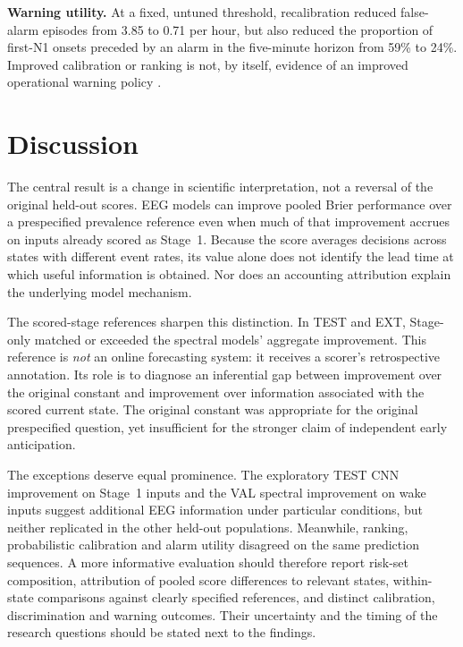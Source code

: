 \documentclass{article}
\begin{document}
\textbf{Warning utility.} At a fixed, untuned threshold, recalibration reduced false-alarm episodes from 3.85 to 0.71 per hour, but also reduced the proportion of first-N1 onsets preceded by an alarm in the five-minute horizon from 59\% to 24\%. Improved calibration or ranking is not, by itself, evidence of an improved operational warning policy \citep[cf.][]{winterhalder2003spc}.

\section{Discussion}
\label{sec:discussion}

The central result is a change in scientific interpretation, not a reversal of the original held-out scores. EEG models can improve pooled Brier performance over a prespecified prevalence reference even when much of that improvement accrues on inputs already scored as Stage~1. Because the score averages decisions across states with different event rates, its value alone does not identify the lead time at which useful information is obtained. Nor does an accounting attribution explain the underlying model mechanism.

The scored-stage references sharpen this distinction. In TEST and EXT, Stage-only matched or exceeded the spectral models' aggregate improvement. This reference is \emph{not} an online forecasting system: it receives a scorer's retrospective annotation. Its role is to diagnose an inferential gap between improvement over the original constant and improvement over information associated with the scored current state. The original constant was appropriate for the original prespecified question, yet insufficient for the stronger claim of independent early anticipation.

The exceptions deserve equal prominence. The exploratory TEST CNN improvement on Stage~1 inputs and the VAL spectral improvement on wake inputs suggest additional EEG information under particular conditions, but neither replicated in the other held-out populations. Meanwhile, ranking, probabilistic calibration and alarm utility disagreed on the same prediction sequences. A more informative evaluation should therefore report risk-set composition, attribution of pooled score differences to relevant states, within-state comparisons against clearly specified references, and distinct calibration, discrimination and warning outcomes. Their uncertainty and the timing of the research questions should be stated next to the findings.
\end{document}
